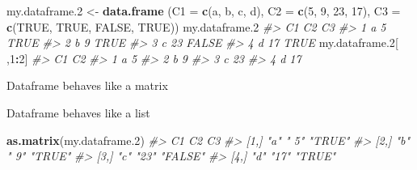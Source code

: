 \documentclass[
]{book}
\newenvironment{Shaded}{\begin{snugshade}}{\end{snugshade}}
\newcommand{\AttributeTok}[1]{\textcolor[rgb]{0.13,0.29,0.53}{#1}}
\newcommand{\CommentTok}[1]{\textcolor[rgb]{0.56,0.35,0.01}{\textit{#1}}}
\newcommand{\ConstantTok}[1]{\textcolor[rgb]{0.56,0.35,0.01}{#1}}
\newcommand{\DecValTok}[1]{\textcolor[rgb]{0.00,0.00,0.81}{#1}}
\newcommand{\FloatTok}[1]{\textcolor[rgb]{0.00,0.00,0.81}{#1}}
\newcommand{\FunctionTok}[1]{\textcolor[rgb]{0.13,0.29,0.53}{\textbf{#1}}}
\newcommand{\NormalTok}[1]{#1}
\newcommand{\OtherTok}[1]{\textcolor[rgb]{0.56,0.35,0.01}{#1}}
\newcommand{\SpecialCharTok}[1]{\textcolor[rgb]{0.81,0.36,0.00}{\textbf{#1}}}
\newcommand{\StringTok}[1]{\textcolor[rgb]{0.31,0.60,0.02}{#1}}
\begin{document}
\begin{Shaded}
\begin{Highlighting}[]
\NormalTok{my.dataframe}\FloatTok{.2} \OtherTok{\textless{}{-}} \FunctionTok{data.frame}\NormalTok{ (}\AttributeTok{C1 =} \FunctionTok{c}\NormalTok{(}\StringTok{\textquotesingle{}a\textquotesingle{}}\NormalTok{, }\StringTok{\textquotesingle{}b\textquotesingle{}}\NormalTok{, }\StringTok{\textquotesingle{}c\textquotesingle{}}\NormalTok{, }\StringTok{\textquotesingle{}d\textquotesingle{}}\NormalTok{), }
                              \AttributeTok{C2 =} \FunctionTok{c}\NormalTok{(}\DecValTok{5}\NormalTok{, }\DecValTok{9}\NormalTok{, }\DecValTok{23}\NormalTok{, }\DecValTok{17}\NormalTok{), }
                              \AttributeTok{C3 =} \FunctionTok{c}\NormalTok{(}\ConstantTok{TRUE}\NormalTok{, }\ConstantTok{TRUE}\NormalTok{, }\ConstantTok{FALSE}\NormalTok{, }\ConstantTok{TRUE}\NormalTok{))}
\NormalTok{my.dataframe}\FloatTok{.2}
\CommentTok{\#\textgreater{}   C1 C2    C3}
\CommentTok{\#\textgreater{} 1  a  5  TRUE}
\CommentTok{\#\textgreater{} 2  b  9  TRUE}
\CommentTok{\#\textgreater{} 3  c 23 FALSE}
\CommentTok{\#\textgreater{} 4  d 17  TRUE}
\NormalTok{my.dataframe}\FloatTok{.2}\NormalTok{[ ,}\DecValTok{1}\SpecialCharTok{:}\DecValTok{2}\NormalTok{]}
\CommentTok{\#\textgreater{}   C1 C2}
\CommentTok{\#\textgreater{} 1  a  5}
\CommentTok{\#\textgreater{} 2  b  9}
\CommentTok{\#\textgreater{} 3  c 23}
\CommentTok{\#\textgreater{} 4  d 17}
\end{Highlighting}
\end{Shaded}

Dataframe behaves like a matrix

\begin{Shaded}
\end{Shaded}

Dataframe behaves like a list

\begin{Shaded}
\begin{Highlighting}[]
\FunctionTok{as.matrix}\NormalTok{(my.dataframe}\FloatTok{.2}\NormalTok{)}
\CommentTok{\#\textgreater{}      C1  C2   C3     }
\CommentTok{\#\textgreater{} [1,] "a" " 5" "TRUE" }
\CommentTok{\#\textgreater{} [2,] "b" " 9" "TRUE" }
\CommentTok{\#\textgreater{} [3,] "c" "23" "FALSE"}
\CommentTok{\#\textgreater{} [4,] "d" "17" "TRUE"}
\end{Highlighting}
\end{Shaded}
\end{document}
